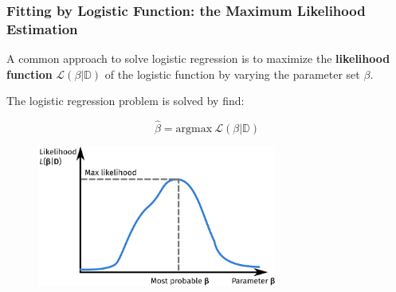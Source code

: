 \documentclass[10pt,aspectratio=169]{beamer}
\begin{document}
  \begin{frame}
    \frametitle{Fitting by Logistic Function: the Maximum Likelihood
      Estimation}

    A common approach to solve logistic regression is to maximize the
    \textbf{likelihood function} $\mathscr{L}(\beta|\mathbb{D})$ of the
    logistic function by varying the parameter set $\beta$.

    The logistic regression problem is solved by find:

    \begin{equation*}
      \hat{\beta} = \mathrm{argmax}\ \mathscr{L}(\beta|\mathbb{D})
    \end{equation*}
    
    \begin{figure}[t] %
       \vspace{-2em}%
           \includegraphics[width=0.7\textwidth]{images/likelihood.pdf}
         \end{figure}

    
       \end{frame}
\end{document}
